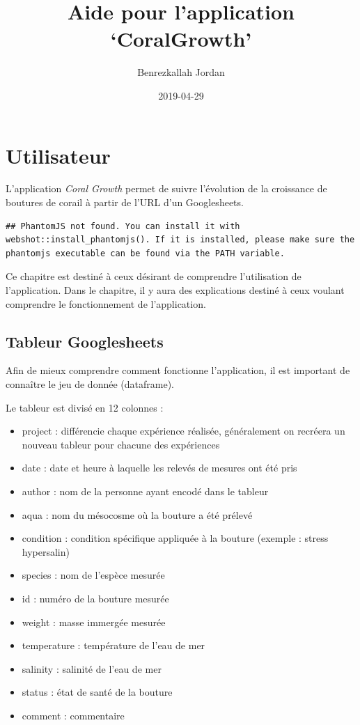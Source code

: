\documentclass[]{book}
\title{Aide pour l'application `CoralGrowth'}
\author{Benrezkallah Jordan}
\date{2019-04-29}
\providecommand{\tightlist}{%
  \setlength{\itemsep}{0pt}\setlength{\parskip}{0pt}}
\begin{document}
\maketitle

{
\setcounter{tocdepth}{1}
\tableofcontents
}
\chapter{Utilisateur}\label{utilisateur}

L'application \emph{Coral Growth} permet de suivre l'évolution de la
croissance de boutures de corail à partir de l'URL d'un Googlesheets.

\begin{verbatim}
## PhantomJS not found. You can install it with webshot::install_phantomjs(). If it is installed, please make sure the phantomjs executable can be found via the PATH variable.
\end{verbatim}

Ce chapitre est destiné à ceux désirant de comprendre l'utilisation de
l'application. Dans le chapitre, il y aura des explications destiné à
ceux voulant comprendre le fonctionnement de l'application.

\section{Tableur Googlesheets}\label{tableur-googlesheets}

Afin de mieux comprendre comment fonctionne l'application, il est
important de connaître le jeu de donnée (dataframe).

Le tableur est divisé en 12 colonnes :

\begin{itemize}
\tightlist
\item
  project : différencie chaque expérience réalisée, généralement on
  recréera un nouveau tableur pour chacune des expériences
\item
  date : date et heure à laquelle les relevés de mesures ont été pris
\item
  author : nom de la personne ayant encodé dans le tableur
\item
  aqua : nom du mésocosme où la bouture a été prélevé
\item
  condition : condition spécifique appliquée à la bouture (exemple :
  stress hypersalin)
\item
  species : nom de l'espèce mesurée
\item
  id : numéro de la bouture mesurée
\item
  weight : masse immergée mesurée
\item
  temperature : température de l'eau de mer
\item
  salinity : salinité de l'eau de mer
\item
  status : état de santé de la bouture
\item
  comment : commentaire
\end{itemize}
\end{document}
